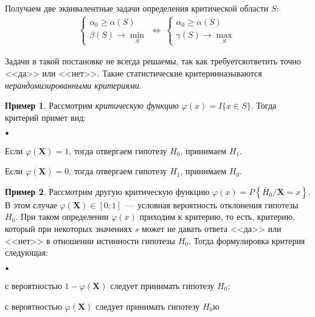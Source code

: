 \documentclass[oneside,final,14pt]{extreport}
\theoremstyle{plain}
\theoremstyle{definition}
\newtheorem*{exmp}{Пример}
\theoremstyle{named}
\newcommand\sbullet[1][.5]{\mathbin{\vcenter{\hbox{\scalebox{#1}{$\bullet$}}}}}
\newenvironment{compactlist}{
\begin{list}{{$\sbullet[.75]$}}{
\setlength\partopsep{0pt}
\setlength\parskip{0pt}
\setlength\parsep{0pt}
\setlength\topsep{0pt}
\setlength\itemsep{0pt}
}
}{
\end{list}
}
\begin{document}
Получаем две эквивалентные задачи определения критической области $S$:
\begin{equation*}
    \begin{array}{l}
    \left\{\begin{array}{l}
    \alpha_{0} \geqslant \alpha(S) \\
    \beta(S) \rightarrow \min\limits_{S}
    \end{array}\right.
    \Leftrightarrow~
    \left\{\begin{array}{l}
    \alpha_{0} \geqslant \alpha(S) \\
    \gamma(S) \rightarrow \max\limits_{S}
    \end{array}\right.
    \end{array}
\end{equation*}

Задачи в такой постановке не всегда решаемы, так как требуетсяответить точно <<да>> или <<нет>>. Такие статистические критерииназываются {\it нерандомизированными критериями}.

\begin{exmp}
Рассмотрим {\it критическую функцию} $\varphi(x)=I\{x \in S\}$. Тогда критерий примет вид:
\begin{compactlist}
    \item Если $\varphi\left(\mathbf{X}\right)=1$, тогда отвергаем гипотезу $H_0$, принимаем $H_1$.
    \item Если $\varphi\left(\mathbf{X}\right)=0$, тогда отвергаем гипотезу $H_1$, принимаем $H_0$.
\end{compactlist}
\end{exmp}

\begin{exmp}
Рассмотрим другую критическую функцию $\varphi(x)=P\left\{\bar{H}_{0} / \mathbf{X}=x\right\}$. В этом случае $\varphi\left(\mathbf{X}\right) \in[0;1]$~--- условная вероятность отклонения гипотезы $H_0$. При таком определении $\varphi(x)$ приходим к { критерию}, то есть, критерию, который при некоторых значениях $s$ может не давать ответа <<да>> или <<нет>> в отношении истинности гипотезы $H_0$. Тогда формулировка критерия следующая:
\begin{compactlist}
    \item с вероятностью $1 - \varphi\left(\mathbf{X}\right)$ следует принимать гипотезу $H_0$;
    \item с вероятностью $\varphi\left(\mathbf{X}\right)$ следует принимать гипотезу $H_0$ю
\end{compactlist}
\end{exmp}
\end{document}
